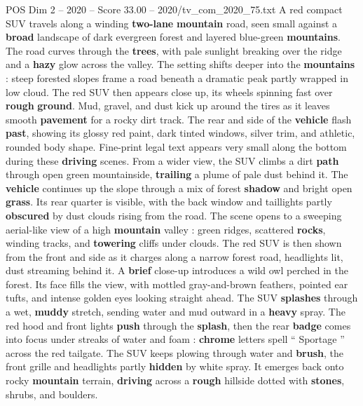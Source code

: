 \begin{textsample}{POS Dim 2 – 2020 – Score 33.00 – 2020/tv\_com\_2020\_75.txt}  \label{ex:f2_pos_042}
A red compact SUV travels along a winding \textbf{two-lane} \textbf{mountain} road, seen small against a \textbf{broad} landscape of dark evergreen forest and layered blue-green \textbf{mountains}.
The road curves through the \textbf{trees}, with pale sunlight breaking over the ridge and a \textbf{hazy} glow across the valley.
The setting shifts deeper into the \textbf{mountains} : steep forested slopes frame a road beneath a dramatic peak partly wrapped in low cloud.
The red SUV then appears close up, its wheels spinning fast over \textbf{rough} \textbf{ground}.
Mud, gravel, and dust kick up around the tires as it leaves smooth \textbf{pavement} for a rocky dirt track.
The rear and side of the \textbf{vehicle} flash \textbf{past}, showing its glossy red paint, dark tinted windows, silver trim, and athletic, rounded body shape.
Fine-print legal text appears very small along the bottom during these \textbf{driving} scenes.
From a wider view, the SUV climbs a dirt \textbf{path} through open green mountainside, \textbf{trailing} a plume of pale dust behind it.
The \textbf{vehicle} continues up the slope through a mix of forest \textbf{shadow} and bright open \textbf{grass}.
Its rear quarter is visible, with the back window and taillights partly \textbf{obscured} by dust clouds rising from the road.
The scene opens to a sweeping aerial-like view of a high \textbf{mountain} valley : green ridges, scattered \textbf{rocks}, winding tracks, and \textbf{towering} cliffs under clouds.
The red SUV is then shown from the front and side as it charges along a narrow forest road, headlights lit, dust streaming behind it.
A \textbf{brief} close-up introduces a wild owl perched in the forest.
Its face fills the view, with mottled gray-and-brown feathers, pointed ear tufts, and intense golden eyes looking straight ahead.
The SUV \textbf{splashes} through a wet, \textbf{muddy} stretch, sending water and mud outward in a \textbf{heavy} spray.
The red hood and front lights \textbf{push} through the \textbf{splash}, then the rear \textbf{badge} comes into focus under streaks of water and foam : \textbf{chrome} letters spell “ Sportage ” across the red tailgate.
The SUV keeps plowing through water and \textbf{brush}, the front grille and headlights partly \textbf{hidden} by white spray.
It emerges back onto rocky \textbf{mountain} terrain, \textbf{driving} across a \textbf{rough} hillside dotted with \textbf{stones}, shrubs, and boulders.

\end{textsample}
